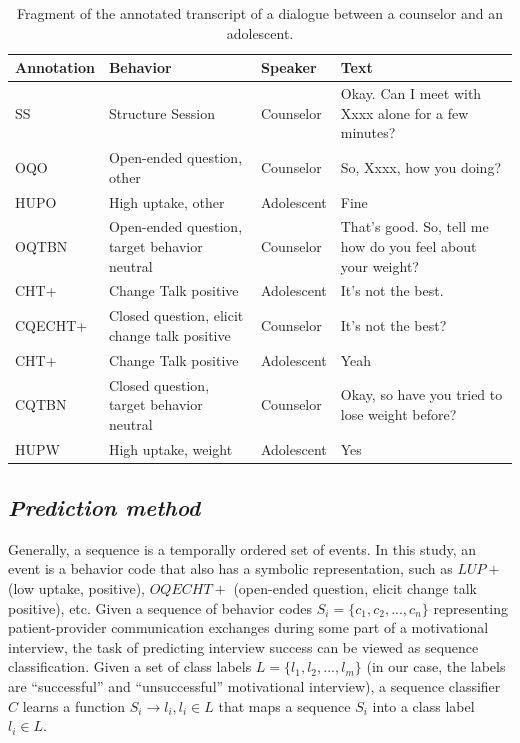 \documentclass{amia_summit_2018}
\begin{document}
\begin{table}[h]
\caption{Fragment of the annotated transcript of a dialogue between a counselor and an adolescent.}    
\label{tab:anno_examp}
\centering
\begin{tabular}{|l|p{3.2cm}|l|p{8cm}|}
\hline
\bf{Annotation}  & \bf{Behavior} & \bf{Speaker} & \bf{Text} \\\hline
SS & Structure Session & Counselor & Okay. Can I meet with Xxxx alone for a few minutes? \\\hline
OQO & Open-ended question, other & Counselor & So, Xxxx, how you doing? \\\hline
HUPO &	High uptake, other	& Adolescent &	Fine \\\hline
OQTBN &	Open-ended question, target behavior neutral & Counselor &	That's good.  So, tell me  how do you feel about your weight? \\\hline
CHT+ &	Change Talk positive	& Adolescent &	It's not the best. \\\hline
CQECHT+ & Closed question, elicit change talk positive & Counselor & It's not the best? \\\hline
CHT+ &	Change Talk positive &	Adolescent & Yeah \\\hline
CQTBN &	Closed question, target behavior neutral  & Counselor &	Okay, so have you tried to lose weight before? \\\hline
HUPW &	High uptake, weight & Adolescent &	Yes \\\hline
\end{tabular}
\end{table}  

\subsection*{\textit{Prediction method}}
Generally, a sequence is a temporally ordered set of events. In this study, an event is a behavior code that also has a symbolic representation, such as $LUP+$ (low uptake, positive), $OQECHT+$ (open-ended question, elicit change talk positive), etc.  Given a sequence of behavior codes $S_i = \{c_1, c_2,...,c_n\}$ representing patient-provider communication exchanges during some part of a motivational interview, the task of predicting interview success can be viewed as sequence classification. Given a set of class labels $L = \{l_1, l_2,...,l_m\}$ (in our case, the labels are ``successful'' and ``unsuccessful'' motivational interview), a sequence classifier $C$ learns a function $S_i \to l_i, l_i \in L$ that maps a sequence $S_i$ into a class label $l_i \in L$.
\end{document}
